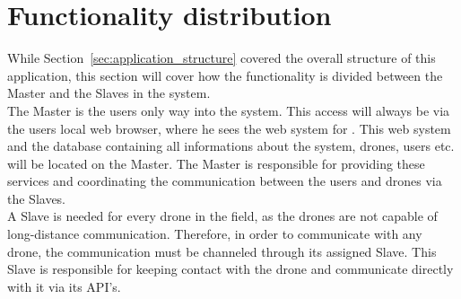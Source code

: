 \section{Functionality distribution}\label{sec:functionality_distrubution}

While Section~\ref{sec:application_structure} covered the overall structure of this application, this section will cover how the functionality is divided between the Master and the Slaves in the system. \\

The Master is the users only way into the system. 
This access will always be via the users local web browser, where he sees the web system for \projectname{}.
This web system and the database containing all informations about the system, drones, users etc. will be located on the Master. 
The Master is responsible for providing these services and coordinating the communication between the users and drones via the Slaves. \\

A Slave is needed for every drone in the field, as the drones are not capable of long-distance communication. 
Therefore, in order to communicate with any drone, the communication must be channeled through its assigned Slave. 
This Slave is responsible for keeping contact with the drone and communicate directly with it via its API's. 


